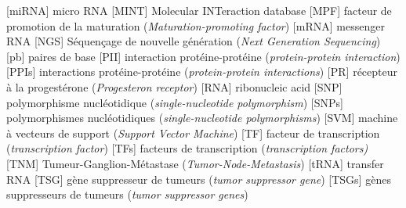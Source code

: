 \begin{acronym}[CDKN2A]
						[miRNA]		{micro \acs{RNA}}
						[MINT]		{Molecular INTeraction database}
						[MPF]		{facteur de promotion de la maturation (\emph{Maturation-promoting factor})}
						[mRNA]		{messenger \ac{RNA}}
						[NGS]		{Séquençage de nouvelle génération (\emph{Next Generation Sequencing})}
						[pb]		{paires de base}
						[PII]		{interaction protéine-protéine (\emph{protein-protein interaction})}
					{interactions protéine-protéine (\emph{protein-protein interactions})}
						[PR]		{récepteur à la progestérone (\emph{Progesteron receptor})}
						[RNA]		{ribonucleic acid}
						[SNP]		{polymorphisme nucléotidique (\emph{single-nucleotide polymorphism})}
					{polymorphismes nucléotidiques (\emph{single-nucleotide polymorphisms})}
						[SVM]		{machine à vecteurs de support (\emph{Support Vector Machine})}
						[TF]		{facteur de transcription (\emph{transcription factor})}
					{facteurs de transcription (\emph{transcription factors)}}
						[TNM]		{Tumeur-Ganglion-Métastase (\emph{Tumor-Node-Metastasis})}
						[tRNA]		{transfer \ac{RNA}}
						[TSG]		{gène suppresseur de tumeurs (\emph{tumor suppressor gene})}
					{gènes suppresseurs de tumeurs (\emph{tumor suppressor genes})}
		\end{acronym}